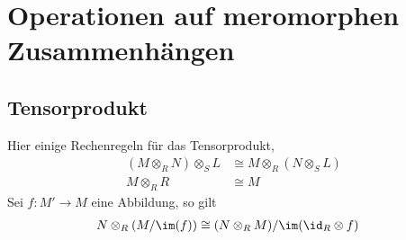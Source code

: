 \chapter{Operationen auf meromorphen Zusammenhängen}
\section{Tensorprodukt}
\begin{comment}
\begin{defn}[Tensorprodukt]
\cite[3(Algebra).11.21]{stacks-project}
\begin{center}
\begin{tikzpicture} [scale=3.3, descr/.style={fill=white,inner sep=2.5pt} ]
  \matrix (m) [
    matrix of math nodes
    , row sep=2em
    , column sep=3em
  ]{
    M\times N & M\otimes_RN \\
              & T \\
  };
  \path[->,font=\scriptsize,>=angle 90]
  (m-1-1) edge node[above]{$  $} (m-1-2)
  (m-1-1) edge node[below]{$f$} (m-2-2)
  ;
  \path[->,font=\scriptsize,>=angle 90,dashed]
  (m-1-2) edge node[right]{$\exists!\gamma$} (m-2-2)
  ;
\end{tikzpicture}
\end{center}
Für eine Abbildung $f:M\rightarrow M'$ definiere das Tensorprodukt davon über
$R$ mit $N$ als
\[
\id_N \otimes f:
\begin{array}[t]{ccc}
N\otimes_{R}M & \rightarrow & N\otimes_{R}M'\\
n\otimes m & \mapsto & n\otimes f(m)
\end{array}
\]
\end{defn}
\end{comment}
\begin{bem} \label{bem:Rechenregeln-Tensorprodukt}
Hier einige Rechenregeln für das Tensorprodukt,
\begin{align}
(M\otimes_R N)\otimes_S L &\cong M\otimes_R (N \otimes_S L)
  \label{bem:Rechenregeln-Tensorprodukt1}\\
M\otimes_R R &\cong M \label{bem:Rechenregeln-Tensorprodukt2}
\end{align}
Sei $f:M'\rightarrow M$ eine Abbildung, so gilt
\begin{align}
N\otimes_R(M/\im(f)) &\cong (N\otimes_R M) / \im(\id_{R}\otimes f)
\label{bem:Rechenregeln-Tensorprodukt3}
\end{align}
\end{bem}

